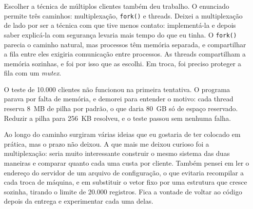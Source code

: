 \documentclass[12pt,a4paper]{article}
\renewcommand{\refname}{Referências bibliográficas}
\begin{document}
Escolher a técnica de múltiplos clientes também deu trabalho. O enunciado permite
três caminhos: multiplexação, \texttt{fork()} e threads. Deixei a multiplexação
de lado por ser a técnica com que tive menos contato: implementá-la e depois
saber explicá-la com segurança levaria mais tempo do que eu tinha. O
\texttt{fork()} parecia o caminho natural, mas processos têm memória separada, e
compartilhar a fila entre eles exigiria comunicação entre processos. As threads
compartilham a memória sozinhas, e foi por isso que as escolhi. Em troca, foi
preciso proteger a fila com um \textit{mutex}.

O teste de 10.000 clientes não funcionou na primeira tentativa. O programa parava
por falta de memória, e demorei para entender o motivo: cada thread reserva 8~MB
de pilha por padrão, o que daria 80~GB só de espaço reservado. Reduzir a pilha
para 256~KB resolveu, e o teste passou sem nenhuma falha.

Ao longo do caminho surgiram várias ideias que eu gostaria de ter colocado em
prática, mas o prazo não deixou. A que mais me deixou curioso foi a
multiplexação: seria muito interessante construir o mesmo sistema das duas
maneiras e comparar quanto cada uma custa por cliente. Também pensei em ler o
endereço do servidor de um arquivo de configuração, o que evitaria recompilar a
cada troca de máquina, e em substituir o vetor fixo por uma estrutura que cresce
sozinha, tirando o limite de 20.000 registros. Fica a vontade de voltar ao código
depois da entrega e experimentar cada uma delas.

\end{document}
